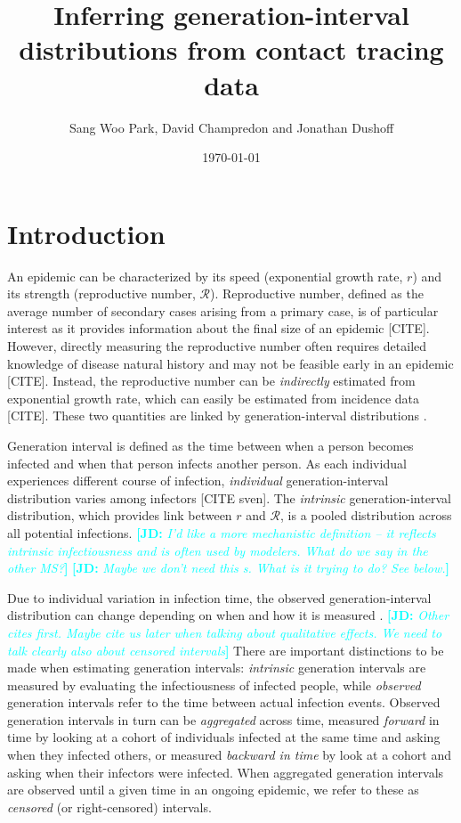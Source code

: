 \documentclass{article}
\title{Inferring generation-interval distributions from contact tracing data}
\author{Sang Woo Park, David Champredon and Jonathan Dushoff}
\date{\today}
\newcommand{\RR}{\ensuremath{{\mathcal R}}}
\newcommand{\comment}[3]{\textcolor{#1}{\textbf{[#2: }\textsl{#3}\textbf{]}}}
\newcommand{\jd}[1]{\comment{cyan}{JD}{#1}}
\begin{document}
\maketitle

\section{Introduction}

An epidemic can be characterized by its speed (exponential growth rate, $r$) and its strength (reproductive number, \RR).
Reproductive number, defined as the average number of secondary cases arising from a primary case, is of particular interest as it provides information about the final size of an epidemic [CITE].
However, directly measuring the reproductive number often requires detailed knowledge of disease natural history and may not be feasible early in an epidemic [CITE].
Instead, the reproductive number can be \emph{indirectly} estimated from exponential growth rate, which can easily be estimated from incidence data [CITE].
These two quantities are linked by generation-interval distributions \citep{wallinga2007generation}.

Generation interval is defined as the time between when a person becomes infected and when that person infects another person.
As each individual experiences different course of infection, \emph{individual} generation-interval distribution varies among infectors [CITE sven].
The \emph{intrinsic} generation-interval distribution, which provides link between $r$ and \RR, is a pooled distribution across all potential infections.
\jd{I'd like a more mechanistic definition -- it reflects intrinsic infectiousness and is often used by modelers. What do we say in the other MS?}
\jd{Maybe we don't need this s. What is it trying to do? See below.}

Due to individual variation in infection time, the observed generation-interval distribution can change depending on when and how it is measured \citep{champredon2015intrinsic}. \jd{Other cites first. Maybe cite us later when talking about qualitative effects. We need to talk clearly also about censored intervals}
There are important distinctions to be made when estimating generation intervals: \emph{intrinsic} generation intervals are measured by evaluating the infectiousness of infected people,
while \emph{observed} generation intervals refer to the time between actual infection events.
Observed generation intervals in turn can be \emph{aggregated} across time, measured \emph{forward} in time by looking at a cohort of individuals infected at the same time and asking when they infected others, or measured \emph{backward in time} by look at a cohort and asking when their infectors were infected.
When aggregated generation intervals are observed until a given time in an ongoing epidemic, we refer to these as \emph{censored} (or right-censored) intervals.
\end{document}
